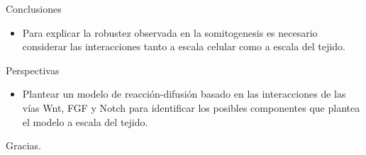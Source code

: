 \documentclass[xcolor=table, xllnames]{beamer}
\begin{document}
\begin{frame}{Conclusiones}
	\begin{itemize}
		\item Para explicar la robustez observada en la somitogenesis es necesario considerar las interacciones tanto a escala celular como a escala del tejido.
	\end{itemize}
	
\end{frame}
	


\begin{frame}{Perspectivas}

	\begin{itemize}
		\item Plantear un modelo de reacción-difusión basado en las interacciones de las vías Wnt, FGF y Notch para identificar los posibles componentes que plantea el modelo a escala del tejido.

\end{itemize}
\end{frame}


\begin{frame}
\Huge{\centerline{Gracias.}}
\end{frame}
\end{document}

